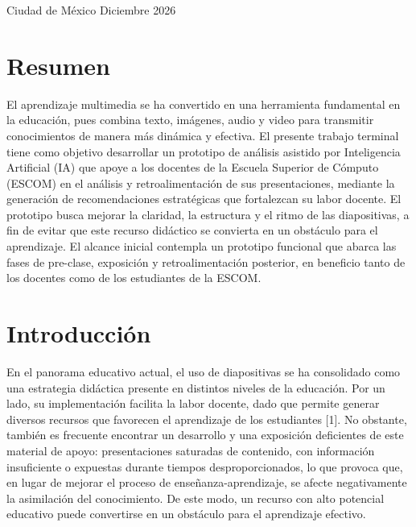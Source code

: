 \documentclass[11pt]{article}
\begin{document}
\begin{titlepage}
    \vfill

    \begin{center}
        {\large Ciudad de México \quad\textbullet\quad Diciembre 2026}
    \end{center}
\end{titlepage}

\tableofcontents
\newpage
\listoffigures
\newpage
\listoftables
\newpage


\section*{Resumen}

El aprendizaje multimedia se ha convertido en una herramienta fundamental en la educación, pues combina texto, imágenes, audio y video para transmitir conocimientos de manera más dinámica y efectiva. El presente trabajo terminal tiene como objetivo desarrollar un prototipo de análisis asistido por Inteligencia Artificial (IA) que apoye a los docentes de la Escuela Superior de Cómputo (ESCOM) en el análisis y retroalimentación de sus presentaciones, mediante la generación de recomendaciones estratégicas que fortalezcan su labor docente. El prototipo busca mejorar la claridad, la estructura y el ritmo de las diapositivas, a fin de evitar que este recurso didáctico se convierta en un obstáculo para el aprendizaje. El alcance inicial contempla un prototipo funcional que abarca las fases de pre-clase, exposición y retroalimentación posterior, en beneficio tanto de los docentes como de los estudiantes de la ESCOM.

\clearpage
\section*{Introducción}
En el panorama educativo actual, el uso de diapositivas se ha consolidado como una estrategia didáctica presente en distintos niveles de la educación. Por un lado, su implementación facilita la labor docente, dado que permite generar diversos recursos que favorecen el aprendizaje de los estudiantes [1]. No obstante, también es frecuente encontrar un desarrollo y una exposición deficientes de este material de apoyo: presentaciones saturadas de contenido, con información insuficiente o expuestas durante tiempos desproporcionados, lo que provoca que, en lugar de mejorar el proceso de enseñanza-aprendizaje, se afecte negativamente la asimilación del conocimiento. De este modo, un recurso con alto potencial educativo puede convertirse en un obstáculo para el aprendizaje efectivo.
\end{document}

